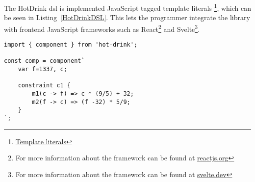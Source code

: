 The HotDrink \gls{dsl} is implemented JavaScript tagged template literals
\footnote{\href{https://developer.mozilla.org/en-US/docs/Web/JavaScript/Reference/Template_literals}{Template literals}}, 
which can be seen in Listing~\ref{HotDrinkDSL}. This lets the programmer integrate the 
library with frontend JavaScript frameworks such as 
React\footnote{For more information about the framework can be found at \href{https://reactjs.org/}{reactjs.org}} and 
Svelte\footnote{For more information about the framework can be found at \href{https://svelte.dev/}{svelte.dev}}. 



\begin{lstlisting}[caption={Example of the HotDrink \gls{dsl}},label=HotDrinkDSL, language=hotdrink]
import { component } from 'hot-drink';

const comp = component`
    var f=1337, c;

    constraint c1 {
        m1(c -> f) => c * (9/5) + 32;
        m2(f -> c) => (f -32) * 5/9;
    }
`;
\end{lstlisting}

